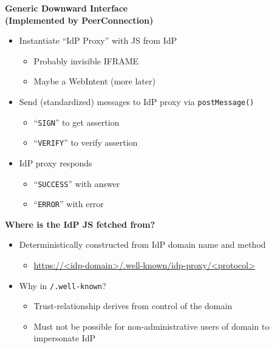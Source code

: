 \documentclass[helvetica]{seminar}
\newcommand{\heading}[1]{%
  \begin{center} 
    \large\bf 
    #1 
  \end{center} 
  \vspace{.4 in}}
\begin{document}
\begin{slide}
\heading{Generic Downward Interface\\(Implemented by PeerConnection)}

\begin{itemize}
\item Instantiate ``IdP Proxy'' with JS from IdP
  \begin{itemize}
  \item Probably invisible IFRAME
  \item Maybe a WebIntent (more later)
  \end{itemize}

\item Send (standardized) messages to IdP proxy via \verb^postMessage()^
  \begin{itemize}
  \item ``\verb^SIGN^'' to get assertion
  \item ``\verb^VERIFY^'' to verify assertion
  \end{itemize}

\item IdP proxy responds 
  \begin{itemize}
  \item ``\verb^SUCCESS^'' with answer
  \item ``\verb^ERROR^'' with error
  \end{itemize}
\end{itemize}

\end{slide}



\begin{slide}
\heading{Where is the IdP JS fetched from?}

\begin{itemize}
\item Deterministically constructed from IdP domain name and method
  \begin{itemize}
  \item[] {\small \url{https://<idp-domain>/.well-known/idp-proxy/<protocol>}}
    \end{itemize}

\item Why in \verb^/.well-known^?
  \begin{itemize}
  \item Trust-relationship derives from control of the domain
  \item Must not be possible for non-administrative users of domain to impersonate IdP
  \end{itemize}
\end{itemize}

\end{slide}
\end{document}
